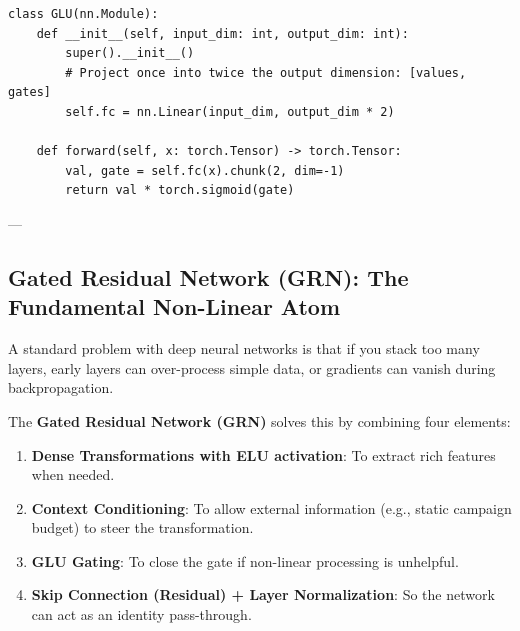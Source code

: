 \documentclass[11pt,a4paper]{article}
\begin{document}
\begin{codebox}
\begin{lstlisting}
class GLU(nn.Module):
    def __init__(self, input_dim: int, output_dim: int):
        super().__init__()
        # Project once into twice the output dimension: [values, gates]
        self.fc = nn.Linear(input_dim, output_dim * 2)

    def forward(self, x: torch.Tensor) -> torch.Tensor:
        val, gate = self.fc(x).chunk(2, dim=-1)
        return val * torch.sigmoid(gate)
\end{lstlisting}
\end{codebox}

---

\subsection{Gated Residual Network (GRN): The Fundamental Non-Linear Atom}

A standard problem with deep neural networks is that if you stack too many layers, early layers can over-process simple data, or gradients can vanish during backpropagation. 

The \textbf{Gated Residual Network (GRN)} solves this by combining four elements:
\begin{enumerate}
    \item \textbf{Dense Transformations with ELU activation}: To extract rich features when needed.
    \item \textbf{Context Conditioning}: To allow external information (e.g., static campaign budget) to steer the transformation.
    \item \textbf{GLU Gating}: To close the gate if non-linear processing is unhelpful.
    \item \textbf{Skip Connection (Residual) + Layer Normalization}: So the network can act as an identity pass-through.
\end{enumerate}
\end{document}
